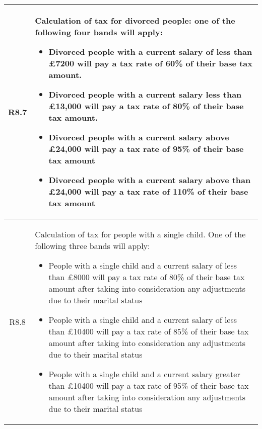\begin{table}[H]
\begin{tabularx}{\textwidth}{| c | X |}
    R8.7 & Calculation of tax for divorced people: one of the following four bands will apply:
    \begin{itemize}[itemsep=\tableitemsep, leftmargin=\tableleftsep]
        \item Divorced people with a current salary of less than £7200 will pay a tax rate
        of 60\% of their base tax amount.
        \item Divorced people with a current salary less than £13,000 will pay a tax rate of
        80\% of their base tax amount.
        \item Divorced people with a current salary above £24,000 will pay a tax rate of
        95\% of their base tax amount
        \item Divorced people with a current salary above than £24,000 will pay a tax rate
        of 110\% of their base tax amount
    \end{itemize}
    \\
    \hline %
    R8.8 & Calculation of tax for people with a single child. One of the following three bands will apply:
    \begin{itemize}[itemsep=\tableitemsep, leftmargin=\tableleftsep]
        \item People with a single child and a current salary of less than £8000 will pay a tax rate of 80\% of their base tax amount after taking into consideration any
        adjustments due to their marital status
        \item People with a single child and a current salary of less than £10400 will pay a
        tax rate of 85\% of their base tax amount after taking into consideration any
        adjustments due to their marital status
        \item People with a single child and a current salary greater than £10400 will pay a
        tax rate of 95\% of their base tax amount after taking into consideration any adjustments due to their marital status
    \end{itemize}
    \\
    \hline %
\end{tabularx}
\end{table}

